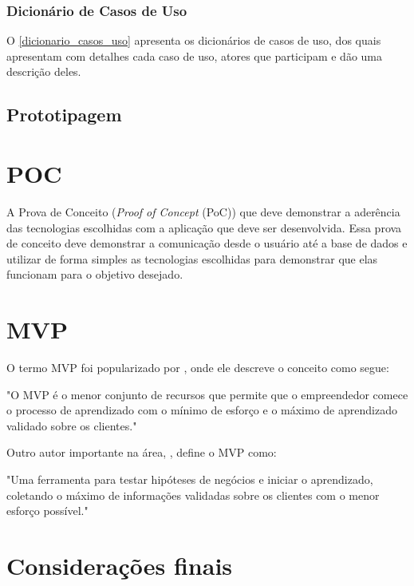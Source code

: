 \documentclass[
	article,			%
	12pt,				%
	oneside,			%
	a4paper,			%
    BIBLATEX,           %
	english,			%
	brazil,				%
	sumario=tradicional
	]{abntex2}
\begin{document}
\subsubsection{Dicionário de Casos de Uso}

O \autoref{dicionario_casos_uso} apresenta os dicionários de casos de uso, dos quais apresentam com detalhes cada caso de uso, atores que participam e dão uma descrição deles.

\subsection{Prototipagem}

\section{POC}

A Prova de Conceito (\textit{Proof of Concept} (PoC)) que deve demonstrar a aderência das tecnologias escolhidas com a aplicação que deve ser desenvolvida. Essa prova de conceito deve demonstrar a comunicação desde o usuário até a base de dados e utilizar de forma simples as tecnologias escolhidas para demonstrar que
elas funcionam para o objetivo desejado.

\section{MVP}

O termo MVP foi popularizado por  , onde ele descreve o conceito como segue:

"O MVP é o menor conjunto de recursos que permite que o empreendedor comece o processo de aprendizado com o mínimo de esforço e o máximo de aprendizado validado sobre os clientes."

Outro autor importante na área, , define o MVP como:

"Uma ferramenta para testar hipóteses de negócios e iniciar o aprendizado, coletando o máximo de informações validadas sobre os clientes com o menor esforço possível."


% 

\section{Considerações finais}
\end{document}
